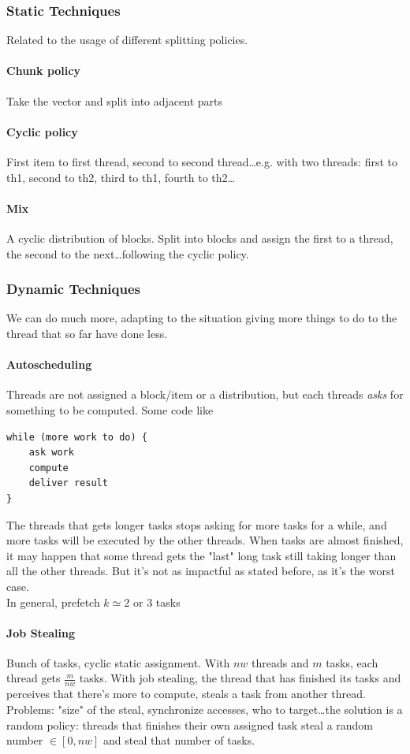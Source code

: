 \documentclass[10pt]{report}
\begin{document}
\subsubsection{Static Techniques}
Related to the usage of different splitting policies.
\paragraph{Chunk policy} Take the vector and split into adjacent parts
\paragraph{Cyclic policy} First item to first thread, second to second thread\ldots e.g. with two threads: first to th1, second to th2, third to th1, fourth to th2\ldots
\paragraph{Mix} A cyclic distribution of blocks. Split into blocks and assign the first to a thread, the second to the next\ldots following the cyclic policy.
\subsubsection{Dynamic Techniques}
We can do much more, adapting to the situation giving more things to do to the thread that so far have done less.
\paragraph{Autoscheduling} Threads are not assigned a block/item or a distribution, but each threads \textit{asks} for something to be computed. Some code like \begin{lstlisting}
while (more work to do) {
	ask work
	compute
	deliver result
}
\end{lstlisting}
The threads that gets longer tasks stops asking for more tasks for a while, and more tasks will be executed by the other threads. When tasks are almost finished, it may happen that some thread gets the "last" long task still taking longer than all the other threads. But it's not as impactful as stated before, as it's the worst case.\\
In general, prefetch $k \simeq 2$ or $3$ tasks
\paragraph{Job Stealing} Bunch of tasks, cyclic static assignment. With $nw$ threads and $m$ tasks, each thread gets $\frac{m}{nw}$ tasks. With job stealing, the thread that has finished its tasks and perceives that there's more to compute, steals a task from another thread. Problems: "size" of the steal, synchronize accesses, who to target\ldots the solution is a random policy: threads that finishes their own assigned task steal a random number $\in[0, nw]$ and steal that number of tasks.
\end{document}
